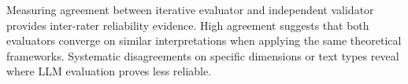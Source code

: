 Measuring agreement between iterative evaluator and independent validator provides inter-rater reliability evidence. High agreement suggests that both evaluators converge on similar interpretations when applying the same theoretical frameworks. Systematic disagreements on specific dimensions or text types reveal where LLM evaluation proves less reliable.

